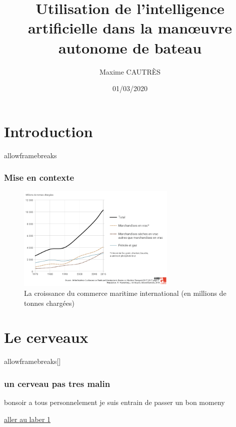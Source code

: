 \documentclass[10pt]{beamer}
\title[IA et conduite autonome]{Utilisation de l'intelligence artificielle dans la manœuvre autonome de bateau}
\author{Maxime CAUTRÈS}
\institute{Lycée Blaise Pascal}
\date{01/03/2020}
\begin{document}
\begin{frame}
  \titlepage
\end{frame}



\section{Introduction}

\begin{frame}{allowframebreaks}{\label{deb}}
  
  \frametitle{Mise en contexte}
 
  \begin{figure}
    \begin{center}
      \includegraphics[height=50mm]{courbe_evo_bateau.png}
      \caption{La croissance du commerce maritime international (en millions de tonnes chargées)}
    \end{center}
  \end{figure}
  
  
\end{frame}

\section{Le cerveaux}

\begin{frame}{allowframebreaks}[\label{2}]
  \frametitle{un cerveau pas tres malin}
  bonsoir a tous personnelement
  je suis entrain de passer un bon momeny
 
  \hyperlink{deb}{aller au laber 1}
\end{frame}
\end{document}
